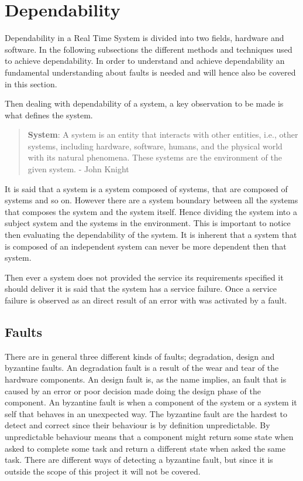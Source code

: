 \section{Dependability}
Dependability in a Real Time System is divided into two fields, hardware and software. 
In the following subsections the different methods and techniques used to achieve dependability.  
In order to understand and achieve dependability an fundamental understanding about faults is needed and will hence also be covered in this section.

Then dealing with dependability of a system, a key observation to be made is what defines the system. 
\begin{quote}
\textbf{System}: A system is an entity that interacts with other entities, i.e., other systems, including hardware, software, humans, and the physical world with its natural phenomena.
These systems are the environment of the given system. - John Knight \cite{FundementalsOfDependableComputingForSoftwareEngineers}
\end{quote}
It is said that a system is a system composed of systems, that are composed of systems and so on. 
However there are a system boundary between all the systems that composes the system and the system itself. 
Hence dividing the system into a subject system and the systems in the environment. 
This is important to notice then evaluating the dependability of the system. 
It is inherent that a system that is composed of an independent system can never be more dependent then that system. 

Then ever a system does not provided the service its requirements specified it should deliver it is said that the system has a service failure. 
Once a service failure is observed as an direct result of an error with was activated by a fault. 

\subsection{Faults}
There are in general three different kinds of faults; degradation, design and byzantine faults. 
An degradation fault is a result of the wear and tear of the hardware components.
An design fault is, as the name implies, an fault that is caused by an error or poor decision made doing the design phase of the component. 
An byzantine fault is when a component of the system or a system it self that behaves in an unexpected way. 
The byzantine fault are the hardest to detect and correct since their behaviour is by definition unpredictable. 
By unpredictable behaviour means that a component might return some state when asked to complete some task and return a different state when asked the same task. 
There are different ways of detecting a byzantine fault, but since it is outside the scope of this project it will not be covered. 

